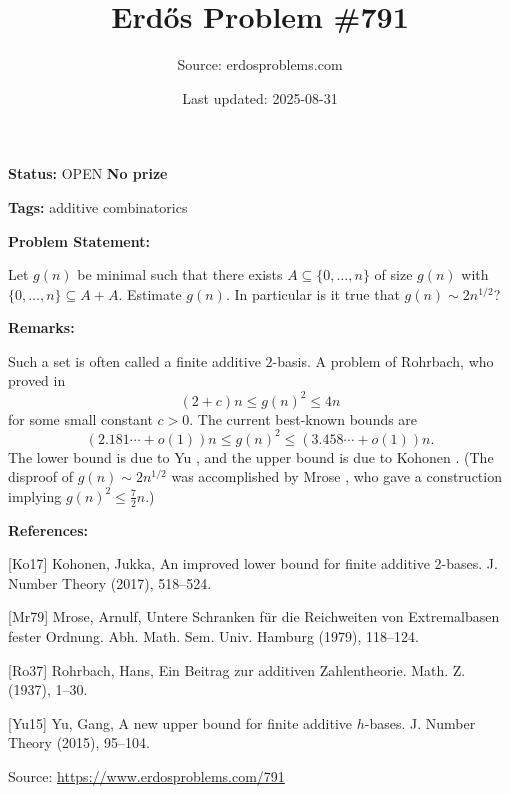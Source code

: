 \documentclass{article}
\title{Erd\H{o}s Problem \#791}
\date{Last updated: 2025-08-31}
\author{Source: erdosproblems.com}
\begin{document}
\maketitle

\noindent\textbf{Status:} OPEN \quad \textbf{No prize}

\noindent\textbf{Tags:} additive combinatorics

\medskip
\noindent\textbf{Problem Statement:}

Let $g(n)$ be minimal such that there exists $A\subseteq \{0,\ldots,n\}$ of size $g(n)$ with $\{0,\ldots,n\}\subseteq A+A$. Estimate $g(n)$. In particular is it true that $g(n)\sim 2n^{1/2}$?

\bigskip
\noindent\textbf{Remarks:}

Such a set is often called a finite additive $2$-basis. A problem of Rohrbach, who proved in \cite{Ro37}\[(2+c)n \leq g(n)^2 \leq 4n\]for some small constant $c>0$. The current best-known bounds are\[(2.181\cdots+o(1))n\leq g(n)^2 \leq (3.458\cdots+o(1))n.\]The lower bound is due to Yu \cite{Yu15}, and the upper bound is due to Kohonen \cite{Ko17}. (The disproof of $g(n)\sim 2n^{1/2}$ was accomplished by Mrose \cite{Mr79}, who gave a construction implying $g(n)^2 \leq \frac{7}{2}n$.)

\bigskip
\noindent\textbf{References:}

[Ko17] Kohonen, Jukka, An improved lower bound for finite additive 2-bases. J. Number Theory (2017), 518--524.
 
 [Mr79] Mrose, Arnulf, Untere Schranken f\"ur die {R}eichweiten von {E}xtremalbasen
fester {O}rdnung. Abh. Math. Sem. Univ. Hamburg (1979), 118--124.
 
 [Ro37] Rohrbach, Hans, Ein {B}eitrag zur additiven {Z}ahlentheorie. Math. Z. (1937), 1--30.
 
 [Yu15] Yu, Gang, A new upper bound for finite additive {$h$}-bases. J. Number Theory (2015), 95--104.

\bigskip
\noindent\small{Source: \url{https://www.erdosproblems.com/791}}
\end{document}
